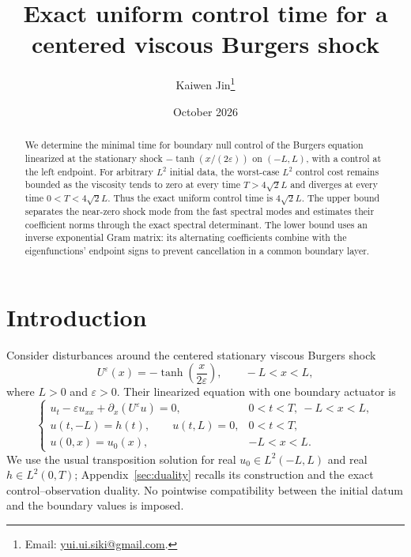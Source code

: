 \documentclass[11pt]{article}
\title{Exact uniform control time for a centered viscous Burgers shock}
\author{Kaiwen Jin\thanks{Email: \href{mailto:yui.ui.siki@gmail.com}{yui.ui.siki@gmail.com}.}}
\date{October 2026}
\numberwithin{equation}{section}
\newcommand{\eps}{\varepsilon}
\begin{document}
\maketitle
\begin{abstract}
We determine the minimal time for boundary null control of the Burgers
equation linearized at the stationary shock
$-\tanh(x/(2\eps))$ on $(-L,L)$, with a control at the left endpoint.
For arbitrary $L^2$ initial data, the worst-case $L^2$ control cost remains
bounded as the viscosity tends to zero at every time $T>4\sqrt2L$ and
diverges at every time $0<T<4\sqrt2L$.
Thus the exact uniform control time is $4\sqrt2L$.
The upper bound separates the near-zero shock mode from the fast spectral
modes and estimates their coefficient norms through the exact spectral
determinant. The lower bound uses an inverse exponential Gram matrix:
its alternating coefficients combine with the eigenfunctions' endpoint
signs to prevent cancellation in a common boundary layer.
\end{abstract}

\section{Introduction}\label{sec:intro}

Consider disturbances around the centered stationary viscous Burgers shock
\[
 U^\eps(x)=-\tanh\!\left(\frac{x}{2\eps}\right),\qquad -L<x<L,
\]
where $L>0$ and $\eps>0$. Their linearized equation with one boundary
actuator is
\begin{equation}\label{eq:primal}
 \begin{cases}
  u_t-\eps u_{xx}+\partial_x(U^\eps u)=0,&0<t<T,\ -L<x<L,\\
  u(t,-L)=h(t),\qquad u(t,L)=0,&0<t<T,\\
  u(0,x)=u_0(x),&-L<x<L.
 \end{cases}
\end{equation}
We use the usual transposition solution for real $u_0\in L^2(-L,L)$ and
real $h\in L^2(0,T)$; Appendix~\ref{sec:duality} recalls its construction and
the exact control--observation duality. No pointwise compatibility between
the initial datum and the boundary values is imposed.
\end{document}
